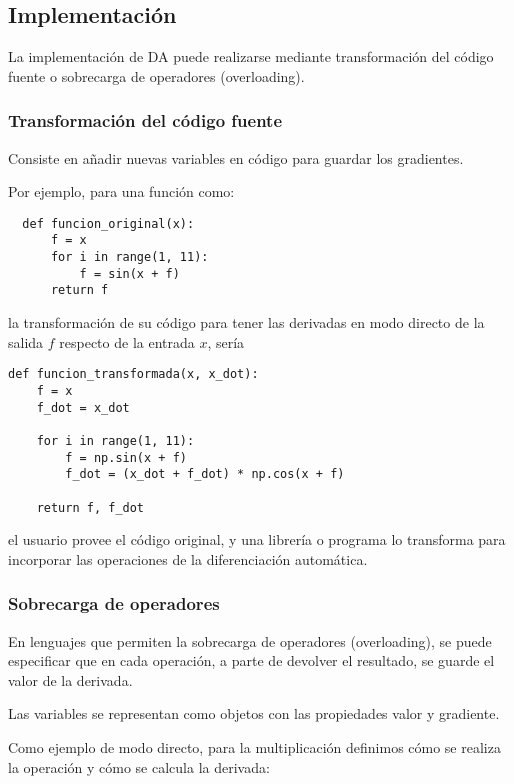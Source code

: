 \subsection{Implementación}

La implementación de DA puede realizarse mediante transformación del código
fuente o sobrecarga de operadores (overloading).

\subsubsection{Transformación del código fuente}

Consiste en añadir nuevas variables en código para guardar los gradientes.

Por ejemplo, para una función como:

\begin{verbatim}
  def funcion_original(x):
      f = x
      for i in range(1, 11):
          f = sin(x + f)
      return f
\end{verbatim}

la transformación de su código para tener las derivadas en modo directo de la
salida $f$ respecto de la entrada $x$, sería

\begin{verbatim}
def funcion_transformada(x, x_dot):
    f = x
    f_dot = x_dot

    for i in range(1, 11):
        f = np.sin(x + f)
        f_dot = (x_dot + f_dot) * np.cos(x + f)

    return f, f_dot
\end{verbatim}

el usuario provee el código original, y una librería o programa lo transforma
para incorporar las operaciones de la diferenciación automática.

\subsubsection{Sobrecarga de operadores}

En lenguajes que permiten la sobrecarga de operadores (overloading), se puede
especificar que en cada operación, a parte de devolver el resultado, se guarde
el valor de la derivada.

Las variables se representan como objetos con las propiedades valor y
gradiente.

Como ejemplo de modo directo, para la multiplicación definimos cómo se realiza
la operación y cómo se calcula la derivada:

